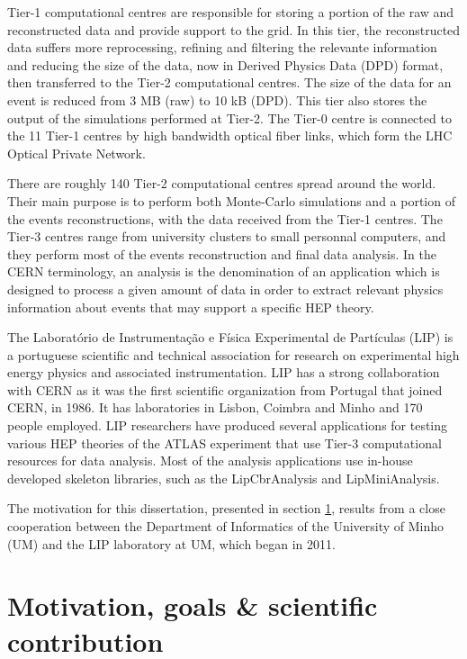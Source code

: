 Tier-1 computational centres are responsible for storing a portion of the raw and reconstructed data and provide support to the grid. In this tier, the reconstructed data suffers more reprocessing, refining and filtering the relevante information and reducing the size of the data, now in Derived Physics Data (DPD) format, then transferred to the Tier-2 computational centres. The size of the data for an event is reduced from 3 MB (raw) to 10 kB (DPD). This tier also stores the output of the simulations performed at Tier-2. The Tier-0 centre is connected to the 11 Tier-1 centres by high bandwidth optical fiber links, which form the LHC Optical Private Network.

There are roughly 140 Tier-2 computational centres spread around the world. Their main purpose is to perform both Monte-Carlo simulations and a portion of the events reconstructions, with the data received from the Tier-1 centres. The Tier-3 centres range from university clusters to small personnal computers, and they perform most of the events reconstruction and final data analysis. In the CERN terminology, an analysis is the denomination of an application which is designed to process a given amount of data in order to extract relevant physics information about events that may support a specific HEP theory.

The Laboratório de Instrumentação e Física Experimental de Partículas (LIP) \cite{LIP} is a portuguese scientific and technical association for research on experimental high energy physics and associated instrumentation. LIP has a strong collaboration with CERN as it was the first scientific organization from Portugal that joined CERN, in 1986. It has laboratories in Lisbon, Coimbra and Minho and 170 people employed. LIP researchers have produced several applications for testing various HEP theories of the ATLAS experiment that use Tier-3 computational resources for data analysis. Most of the analysis applications use in-house developed skeleton libraries, such as the LipCbrAnalysis and LipMiniAnalysis.

The motivation for this dissertation, presented in section \ref{Motivation}, results from a close cooperation between the Department of Informatics of the University of Minho (UM) and the LIP laboratory at UM, which began in 2011.

\section{Motivation, goals \& scientific contribution}
\label{Motivation}

